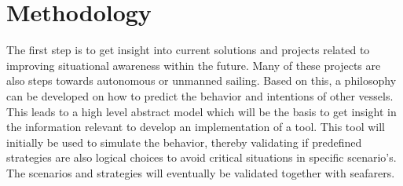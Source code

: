 \section*{Methodology}
The first step is to get insight into current solutions and projects related to improving situational awareness within the future. Many of these projects are also steps towards autonomous or unmanned sailing. Based on this, a philosophy can be developed on how to predict the behavior and intentions of other vessels. This leads to a high level abstract model which will be the basis to get insight in the information relevant to develop an implementation of a tool. This tool will initially be used to simulate the behavior, thereby validating if predefined strategies are also logical choices to avoid critical situations in specific scenario's. The scenarios and strategies will eventually be validated together with seafarers.
